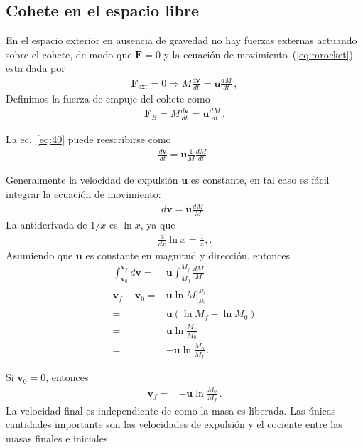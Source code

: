 \subsection{Cohete en el espacio libre}

En el espacio exterior en ausencia de gravedad no hay fuerzas externas actuando sobre el cohete, de modo que $\mathbf{F}=0$ y la ecuación de movimiento~(\ref{eq:mrocket}) esta dada por
\begin{align}
\label{eq:m40}
  \mathbf{F}_{\text{ext}}=0\Longrightarrow M\frac{d\mathbf{v}}{dt}=\mathbf{u}\frac{dM}{dt}\,,
\end{align}
Definimos la fuerza de empuje del cohete como
\begin{align}
  \label{eq:m39}
  \mathbf{F}_E=M\frac{d\mathbf{v}}{dt}=\mathbf{u}\frac{dM}{dt}\,.
\end{align}

La ec.~\eqref{eq:40} puede reescribirse como
\begin{align}
  \label{eq:m41}
  \frac{d\mathbf{v}}{dt}=\mathbf{u}\frac{1}{M}\frac{dM}{dt}\,.
\end{align}


Generalmente la velocidad de expulsión $\mathbf{u}$ es constante, en tal caso es fácil integrar la ecuación de movimiento:
\begin{align}
{d\mathbf{v}}=\mathbf{u}\frac{dM}{M}\,.
\end{align}
La antiderivada de $1/x$ es $\ln x$, ya que
\begin{align}
  \frac{d}{dx}\ln x=\frac{1}{x},.
\end{align}
Asumiendo que $\mathbf{u}$ es constante en magnitud y dirección,
entonces
\begin{align}
  \int_{\mathbf{v}_0}^{\mathbf{v}_f}{d\mathbf{v}}=&\mathbf{u}\int_{M_0}^{M_f}\frac{dM}{M}\nonumber\\
\mathbf{v}_f-\mathbf{v}_0=&\mathbf{u}\ln M\left|_{{}_{M_0}}^{{}^{M_f}}\right.\nonumber\\
=&\mathbf{u}\left(\ln M_f-\ln M_0\right)\nonumber\\
=&\mathbf{u}\ln\frac{M_f}{M_0}\nonumber\\
=&-\mathbf{u}\ln\frac{M_0}{M_f}\,.
\end{align}

Si $\mathbf{v}_0=0$, entonces
\begin{align}
  \mathbf{v}_f=&-\mathbf{u}\ln\frac{M_0}{M_f}\,.
\end{align}
La velocidad final es independiente de como la masa es liberada. Las únicas cantidades importante son las velocidades de expulsión y el cociente entre las masas finales e iniciales.

